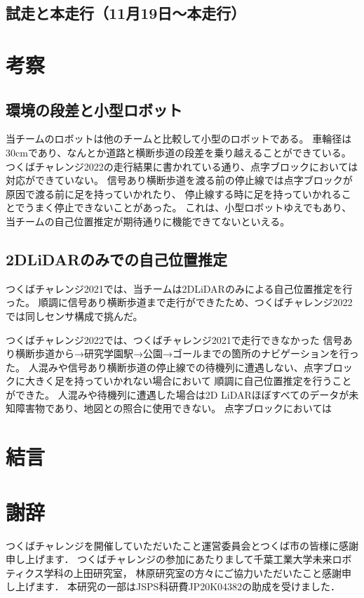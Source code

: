 \documentclass[twocolumn,9pt]{jsproceedings}
\begin{document}
\subsection{試走と本走行（11月19日〜本走行）}


\section{考察}

\subsection{環境の段差と小型ロボット}

当チームのロボットは他のチームと比較して小型のロボットである。
車輪径は30cmであり、なんとか道路と横断歩道の段差を乗り越えることができている。
つくばチャレンジ2022の走行結果に書かれている通り、点字ブロックにおいては対応ができていない。
信号あり横断歩道を渡る前の停止線では点字ブロックが原因で渡る前に足を持っていかれたり、
停止線する時に足を持っていかれることでうまく停止できないことがあった。
これは、小型ロボットゆえでもあり、当チームの自己位置推定が期待通りに機能できてないといえる。

\subsection{2DLiDARのみでの自己位置推定}

つくばチャレンジ2021では、当チームは2DLiDARのみによる自己位置推定を行った\cite{RTshop}。
順調に信号あり横断歩道まで走行ができたため、つくばチャレンジ2022では同しセンサ構成で挑んだ。

つくばチャレンジ2022では、つくばチャレンジ2021で走行できなかった
信号あり横断歩道から→研究学園駅→公園→ゴールまでの箇所のナビゲーションを行った。
人混みや信号あり横断歩道の停止線での待機列に遭遇しない、点字ブロックに大きく足を持っていかれない場合において
順調に自己位置推定を行うことができた。
人混みや待機列に遭遇した場合は2D LiDARほぼすべてのデータが未知障害物であり、地図との照合に使用できない。
点字ブロックにおいては

\section{結言}

\section*{謝辞}
つくばチャレンジを開催していただいたこと運営委員会とつくば市の皆様に感謝申し上げます．
つくばチャレンジの参加にあたりまして千葉工業大学未来ロボティクス学科の上田研究室，
林原研究室の方々にご協力いただいたこと感謝申し上げます．
本研究の一部はJSPS科研費JP20K04382の助成を受けました．
\end{document}
